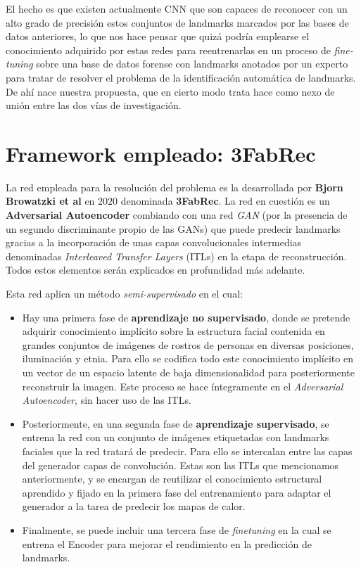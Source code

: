     \medskip

    \noindent El hecho es que existen actualmente CNN que son capaces de reconocer con un alto grado de precisión estos conjuntos de landmarks marcados por las bases de datos anteriores, lo que nos hace pensar que quizá podría emplearse el conocimiento adquirido por estas redes para reentrenarlas en un proceso de \textit{fine-tuning} sobre una base de datos forense con landmarks anotados por un experto para tratar de resolver el problema de la identificación automática de landmarks. De ahí nace nuestra propuesta, que en cierto modo trata hace como nexo de unión entre las dos vías de investigación. 


\section{Framework empleado: 3FabRec }
        \noindent La red empleada para la resolución del problema es la desarrollada por \textbf{Bjorn Browatzki et al} en $2020$ \cite{browatzki20203fabrec} denominada \textbf{3FabRec}. La red en cuestión es un \textbf{Adversarial Autoencoder} combiando con una red \textit{GAN} (por la presencia de un segundo discriminante propio de las GANs) que puede predecir landmarks gracias a la incorporación de unas capas convolucionales intermedias denominadas \textit{Interleaved Transfer Layers} (ITLs) en la etapa de reconstrucción. Todos estos elementos serán explicados en profundidad más adelante.      

        \medskip

        \noindent Esta red aplica un método \textit{semi-supervisado} en el cual:

        \begin{itemize}
            \item Hay una primera fase de \textbf{aprendizaje no supervisado}, donde se pretende adquirir conocimiento implícito sobre la estructura facial contenida en grandes conjuntos de imágenes de rostros de personas en diversas posiciones, iluminación y etnia. Para ello se codifica todo este conocimiento implícito en un vector de un espacio latente de baja dimensionalidad para posteriormente reconstruir la imagen. Este proceso se hace íntegramente en el \textit{Adversarial Autoencoder}, sin hacer uso de las ITLs.
            \item Posteriormente, en una segunda fase de \textbf{aprendizaje supervisado}, se entrena la red con un conjunto de imágenes etiquetadas con landmarks faciales que la red tratará de predecir. Para ello se intercalan entre las capas del generador capas de convolución. Estas son las ITLs que mencionamos anteriormente, y se encargan de reutilizar el conocimiento estructural aprendido y fijado en la primera fase del entrenamiento para adaptar el generador a la tarea de predecir los mapas de calor.
            \item Finalmente, se puede incluir una tercera fase de \textit{finetuning} en la cual se entrena el Encoder para mejorar el rendimiento en la predicción de landmarks.
        \end{itemize} 

